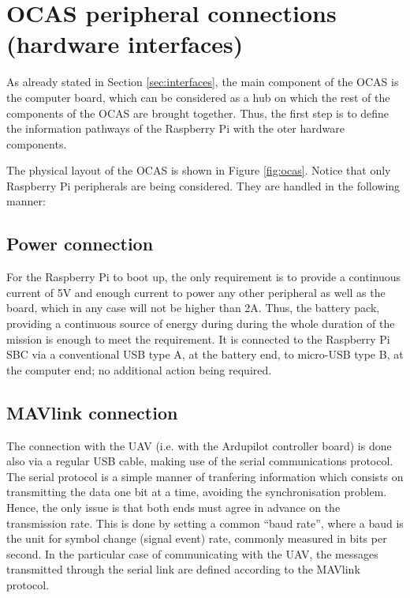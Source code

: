 


\section{OCAS peripheral connections (hardware interfaces)} \label{sec:peripheral}

As already stated in Section \ref{sec:interfaces}, the main component of the OCAS is the computer board, which can be considered as a hub on which the rest of the components of the OCAS are brought together.
Thus, the first step is to define the information pathways of the Raspberry Pi with the oter hardware components.

The physical layout of the OCAS is shown in Figure \ref{fig:ocas}. 
Notice that only Raspberry Pi peripherals are being considered. 
They are handled in the following manner:



\subsection{Power connection}
For the Raspberry Pi to boot up, the only requirement is to provide a continuous current of 5V and enough current to power any other peripheral as well as the board, which in any case will not be higher than 2A.
Thus, the battery pack, providing a continuous source of energy during during the whole duration of the mission is enough to meet the requirement.
It is connected to the Raspberry Pi SBC via a conventional USB type A, at the battery end, to micro-USB type B, at the computer end; no additional action being required.

\subsection{MAVlink connection}
The connection with the UAV (i.e. with the Ardupilot controller board) is done also via a regular USB cable, making use of the serial communications protocol.
The serial protocol is a simple manner of tranfering information which consists on transmitting the data one bit at a time, avoiding the synchronisation problem.
Hence, the only issue is that both ends must agree in advance on the transmission rate.
This is done by setting a common ``baud rate'', where a baud is the unit for symbol change (signal event) rate, commonly measured in bits per second.
In the particular case of communicating with the UAV, the messages transmitted through the serial link are defined according to the MAVlink protocol.

